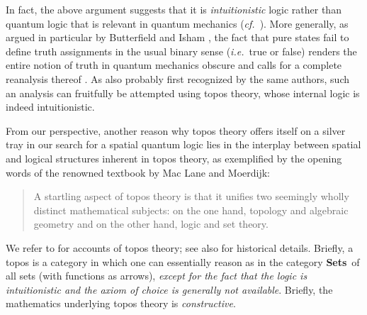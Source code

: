\documentclass[12pt]{article}
\newcommand{\Sets}{\mbox{\textbf{Sets}}}
\newcommand{\ie}{\textit{i.e.}}
\begin{document}
In fact, the above argument suggests
that it is  {\it intuitionistic} logic rather than quantum logic that
is relevant in quantum mechanics
(\textit{cf.}~\cite{AdelmanCorbett}). More generally, as argued in
particular by Butterfield and  Isham \cite{ButVat,butterfieldisham1}, the fact that pure states fail
to define truth assignments in the usual binary sense (\ie\ true or
false)  renders the entire notion of truth in quantum mechanics
obscure and calls for a complete reanalysis thereof
\cite{doringisham1,doringisham2,doringisham3,doringisham4,doeringisham:review}.
 As also probably first recognized by the same authors,
 such an analysis can fruitfully be attempted using topos theory,
 whose internal logic is indeed intuitionistic.

 From our perspective, another reason why topos theory offers itself on a silver tray in our search for a spatial quantum logic lies
in the  interplay between spatial and logical structures inherent in topos theory, as exemplified by
the opening words of the renowned textbook by Mac Lane and Moerdijk:
\begin{quote}
A startling aspect of topos theory is that it unifies two seemingly wholly distinct mathematical subjects: on the one hand, topology and algebraic geometry and on the other hand, logic and set theory.
\end{quote}

We refer to
\cite{goldblatt84,maclanemoerdijk92,johnstone02a,johnstone02b}  for  accounts of topos theory; see also \cite{bell05,McLarty,kroemer07} for historical details.
Briefly, a topos is a category in which one can essentially reason as in the
category \Sets\ of all sets (with functions as arrows), {\it except for the fact that the logic is intuitionistic and the axiom of choice is generally not available}.  Briefly, the mathematics underlying topos theory is  {\it constructive}.
\end{document}
